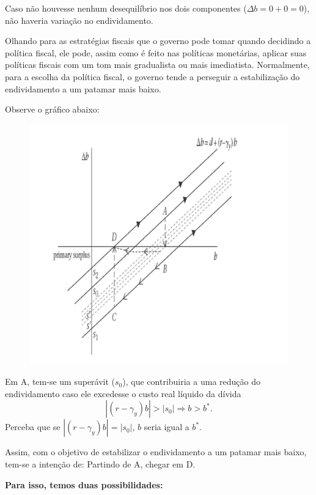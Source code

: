 \documentclass[a4paper,12pt]{article}[abntex2]
\begin{document}
Caso não houvesse nenhum desequilíbrio nos dois componentes ($\Delta b = 0 + 0 = 0$), não haveria variação no endividamento.

Olhando para as estratégias fiscais que o governo pode tomar quando decidindo a política fiscal, ele pode, assim como é feito nas políticas monetárias, aplicar suas políticas fiscais com um tom mais gradualista ou mais imediatista. Normalmente, para a escolha da política fiscal, o governo tende a perseguir a estabilização do endividamento a um patamar mais baixo. 

Observe o gráfico abaixo: 

\begin{figure}[H]
    \centering
    \includegraphics[width=0.7\linewidth]{Imagens/a19i2.png}
\end{figure}

Em A, tem-se um superávit (\(s_0\)), que contribuiria a uma redução do endividamento caso ele excedesse o custo real líquido da dívida 
\[
|(r - \gamma_y)b| > |s_0| \Rightarrow b > b^*.
\]
Perceba que se \(|(r - \gamma_y)b| = |s_0|\), \(b\) seria igual a \(b^*\). 

Assim, com o objetivo de estabilizar o endividamento a um patamar mais baixo, tem-se a intenção de: 
Partindo de A, chegar em D.

\textbf{Para isso, temos duas possibilidades:}
\end{document}
